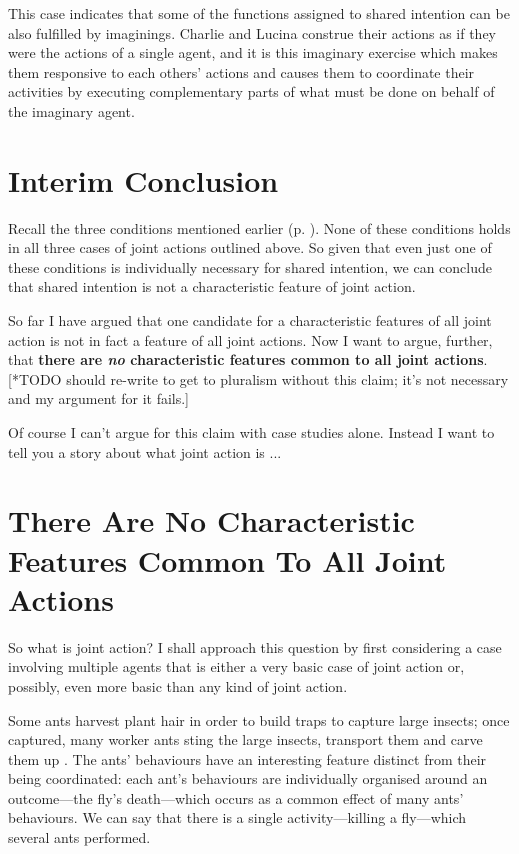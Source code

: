 \documentclass[12pt,a4paper]{extarticle}
\begin{document}
This case indicates that some of the functions assigned to shared intention can be also fulfilled by imaginings.  Charlie and Lucina construe their actions as if they were the actions of a single agent, and it is this imaginary exercise which makes them responsive to each others' actions and causes them to coordinate their activities by executing complementary parts of what must be done on behalf of the imaginary agent.




\section{Interim Conclusion}

Recall the three conditions mentioned earlier (p. \pageref{conditions-for-shared-intention}).  
None of these conditions holds in all three cases of joint actions outlined above.  
So given that even just one of these conditions is individually necessary for shared intention, we can conclude that shared intention is not a characteristic feature of joint action.  


So far I have argued that one candidate for a characteristic features of all joint action is not in fact a feature of all joint actions.  Now I want to argue, further, that \textbf{there are \emph{no} characteristic features common to all joint actions}.  [*TODO should re-write to get to pluralism without this claim; it's not necessary and my argument for it fails.]

Of course I can't argue for this claim with case studies alone.  Instead I want to tell you a story about what joint action is ...


\section{There Are No Characteristic Features Common To All Joint Actions}

So what is joint action?  
I shall approach this question by first considering a case involving multiple agents that is either a very basic case of joint action or, possibly, even more basic than any kind of joint action.  

Some ants harvest plant hair in order to build traps to capture large insects; once captured, many worker ants sting the large insects, transport them and carve them up \citep{Dejean:2005vb}.  The ants’ behaviours have an interesting feature distinct from their being coordinated: each ant’s behaviours are individually organised around an outcome—the fly’s death—which occurs as a common effect of many ants’ behaviours.  We can say that there is a single activity—killing a fly—which several ants performed.  
\end{document}
